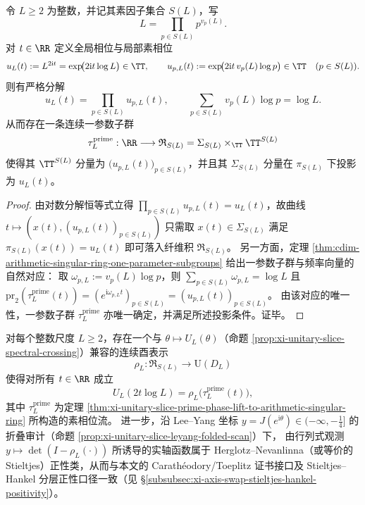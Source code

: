\begin{theorem}[幺正切片的素相位提升与算术奇异环流]\label{thm:xi-unitary-slice-prime-phase-lift-to-arithmetic-singular-ring}
令 \(L\ge 2\) 为整数，并记其素因子集合 \(S(L)\)，写
\[
L=\prod_{p\in S(L)}p^{v_p(L)}.
\]
对 \(t\in\RR\) 定义全局相位与局部素相位
\[
u_L(t):=L^{2\mathrm{i}t}=\exp\!\bigl(2\mathrm{i}t\log L\bigr)\in\TT,
\qquad
u_{p,L}(t):=\exp\!\bigl(2\mathrm{i}t\,v_p(L)\log p\bigr)\in\TT\quad(p\in S(L)).
\]
则有严格分解
\[
u_L(t)=\prod_{p\in S(L)}u_{p,L}(t),
\qquad
\sum_{p\in S(L)}v_p(L)\log p=\log L.
\]
从而存在一条连续一参数子群
\[
\tau^{\mathrm{prime}}_{L}:\RR\longrightarrow \mathfrak{R}_{S(L)}=\Sigma_{S(L)}\times_{\TT}\TT^{S(L)}
\]
使得其 \(\TT^{S(L)}\) 分量为 \(\bigl(u_{p,L}(t)\bigr)_{p\in S(L)}\)，并且其 \(\Sigma_{S(L)}\) 分量在 \(\pi_{S(L)}\) 下投影为 \(u_L(t)\)。
\end{theorem}
\begin{proof}
由对数分解恒等式立得 \(\prod_{p\in S(L)}u_{p,L}(t)=u_L(t)\)，故曲线
\(
t\mapsto (x(t),(u_{p,L}(t))_{p\in S(L)})
\)
只需取 \(x(t)\in\Sigma_{S(L)}\) 满足 \(\pi_{S(L)}(x(t))=u_L(t)\) 即可落入纤维积 \(\mathfrak{R}_{S(L)}\)。
另一方面，定理 \ref{thm:cdim-arithmetic-singular-ring-one-parameter-subgroups} 给出一参数子群与频率向量的自然对应：
取 \(\omega_{p,L}:=v_p(L)\log p\)，则 \(\sum_{p\in S(L)}\omega_{p,L}=\log L\) 且 \(\mathrm{pr}_2(\tau^{\mathrm{prime}}_L(t))=(e^{\mathrm{i}\omega_{p,L}t})_{p\in S(L)}=(u_{p,L}(t))_{p\in S(L)}\)。
由该对应的唯一性，一参数子群 \(\tau^{\mathrm{prime}}_L\) 亦唯一确定，并满足所述投影条件。证毕。
\end{proof}

\begin{conjecture}[算术奇异环表示的幺正切片因子化与正性约束]\label{conj:xi-unitary-slice-arithmetic-singular-ring-representation}
对每个整数尺度 \(L\ge 2\)，存在一个与 \(\theta\mapsto U_L(\theta)\)（命题 \ref{prop:xi-unitary-slice-spectral-crossing}）兼容的连续酉表示
\[
\rho_L:\mathfrak{R}_{S(L)}\to \mathrm{U}(D_L)
\]
使得对所有 \(t\in\RR\) 成立
\[
U_L(2t\log L)=\rho_L\bigl(\tau^{\mathrm{prime}}_L(t)\bigr),
\]
其中 \(\tau^{\mathrm{prime}}_L\) 为定理 \ref{thm:xi-unitary-slice-prime-phase-lift-to-arithmetic-singular-ring} 所构造的素相位流。
进一步，沿 Lee--Yang 坐标 \(y=J(e^{\mathrm{i}\theta})\in(-\infty,-\tfrac14]\) 的折叠审计（命题 \ref{prop:xi-unitary-slice-leyang-folded-scan}）下，
由行列式观测 \(y\mapsto \det(I-\rho_L(\cdot))\) 所诱导的实轴函数属于 Herglotz--Nevanlinna（或等价的 Stieltjes）正性类，从而与本文的 Carath\'eodory/Toeplitz 证书接口及 Stieltjes--Hankel 分层正性口径一致（见 \S\ref{subsubsec:xi-axis-swap-stieltjes-hankel-positivity}）。
\end{conjecture}

\endinput
